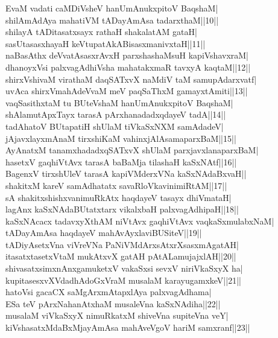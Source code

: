 \documentclass{article}
\begin{document}
EvaM vadati caMDiVsheV hanUmAnukxpitoV BaqshaM|\\
shilAmAdAya mahatiVM tADayAmAsa tadarxthaM||10||\\
shilayA tADitasatxsayx rathaH shakalatAM gataH|\\
sasUtasasxhayaH keVtupatAkABisasxmanivxtaH||11||\\
naBasAthx deVvatAsasxrAvxH parxshashaMsuH kapiVshavxraM|\\
dhanoyxVsi palxvagAdhiVsha mahatakxmaR tavxyA kaqtaM||12||\\
shirxVshivaM virathaM daqSATxvX naMdiV taM samupAdarxvatf|\\
uvAca shirxVmahAdeVvaM meV paqSaThxM gamayxtAmiti||13||\\
vaqSasithxtaM tu BUteVshaM hanUmAnukxpitoV BaqshaM|\\
shAlamutApxTayx tarasA pArxhanadadxqdayeV tadA||14||\\
tadAhatoV BUtapatiH shUlaM tiVkaSxNXM samAdadeV|\\
jAjavxlayxmAnaM tirxshiKaM vahinxjAlAsamaparxBaM||15||\\
AyAnatxM tanamxhadadxqSATxvX shUlaM parxjavxlanaparxBaM|\\
hasetxV gaqhiVtAvx tarasA baBaMja tilashaH kaSxNAtf||16||\\
BagenxV tirxshUleV tarasA kapiVMderxVNa kaSxNAdaBxvaH||\\
shakitxM kareV samAdhatatx savaRloVkavinimiRtAM||17||\\
sA shakitxshishxvanimuRkAtx haqdayeV tasayx dhiVmataH|\\
lagAnx kaSxNAdaBUtatxtarx vikalxbaH palxvagAdhipaH||18||\\
kaSxNAcacx tadavxyXthAM niVtAvx gaqhiVtAvx vaqkaSxmulabxNaM|\\
tADayAmAsa haqdayeV mahAvAyxlaviBUSiteV||19||\\
tADiyAsetxVna viVreVNa PaNiVMdArxsAtxrXsasxmAgatAH|\\
itasatxtasetxVtaM mukAtxvX gatAH pAtALamujajxlAH||20||\\
shivasatxsimxnAnxgamuketxV vakaSxsi sevxV niriVkaSxyX ha|\\
kupitasesxvXVdadhAdoGxVraM musalaM karayugamxkeV||21||\\
hatoVsi gacaCX saMgArxmAtapxlAya palxvagAdhama|\\
ESa teV pArxNahanAtxhaM musaleVna kaSxNAdiha||22||\\
musalaM viVkaSxyX nimuRkatxM shiveVna supiteVna veY|\\
kiVshasatxMdaBxMjayAmAsa mahAveVgoV hariM samxranf||23||\\
\end{document}
